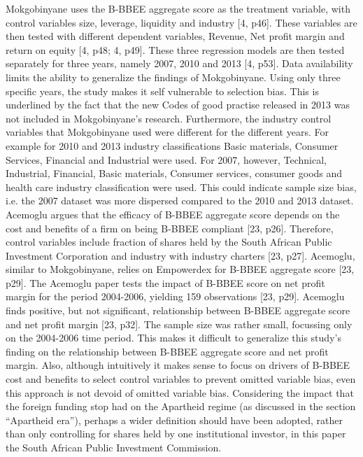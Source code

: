 Mokgobinyane uses the B-BBEE aggregate score as the treatment variable, with control variables size, leverage, liquidity and industry [4, p46]. These variables are then tested with different dependent variables, Revenue, Net profit margin and return on equity [4, p48; 4, p49]. These three regression models are then tested separately for three years, namely 2007, 2010 and 2013 [4, p53]. Data availability limits the ability to generalize the findings of Mokgobinyane. Using only three specific years, the study makes it self vulnerable to selection bias. This is underlined by the fact that the new Codes of good practise released in 2013 was not included in Mokgobinyane’s research. Furthermore, the industry control variables that Mokgobinyane used were different for the different years. For example for 2010 and 2013 industry classifications Basic materials, Consumer Services, Financial and Industrial were used. For 2007, however, Technical, Industrial, Financial, Basic materials, Consumer services, consumer goods and health care industry classification were used. This could indicate sample size bias, i.e. the 2007 dataset was more dispersed compared to the 2010 and 2013 dataset. Acemoglu argues that the efficacy of B-BBEE aggregate score depends on the cost and benefits of a firm on being B-BBEE compliant [23, p26]. Therefore, control variables include fraction of shares held by the South African Public Investment Corporation and industry with industry charters [23, p27]. Acemoglu, similar to Mokgobinyane, relies on Empowerdex for B-BBEE aggregate score [23, p29]. The Acemoglu paper tests the impact of B-BBEE score on net profit margin for the period 2004-2006, yielding 159 observations [23, p29]. Acemoglu finds positive, but not significant, relationship between B-BBEE aggregate score and net profit margin [23, p32]. The sample size was rather small, focussing only on the 2004-2006 time period. This makes it difficult to generalize this study’s finding on the relationship between B-BBEE aggregate score and net profit margin. Also, although intuitively it makes sense to focus on drivers of B-BBEE cost and benefits to select control variables to prevent omitted variable bias, even this approach is not devoid of omitted variable bias. Considering the impact that the foreign funding stop had on the Apartheid regime (as discussed in the section “Apartheid era”), perhaps a wider definition should have been adopted, rather than only controlling for shares held by one institutional investor, in this paper the South African Public Investment Commission.

